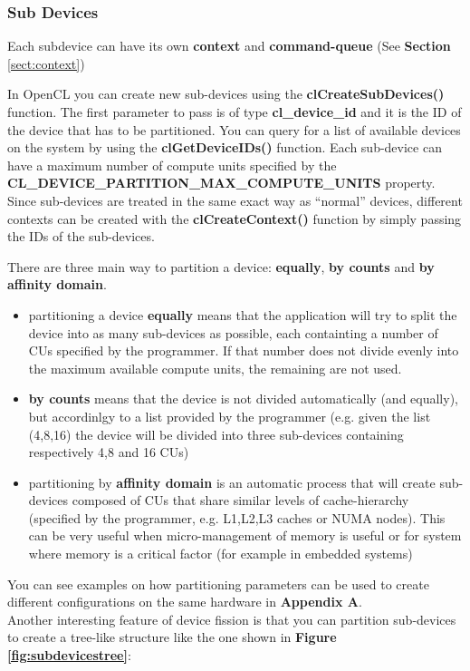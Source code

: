 \subsubsection{Sub Devices} \label{sect:DF-subdevices}
Each subdevice can have its own \textbf{context} and \textbf{command-queue} (See \textbf{Section} \ref{sect:context})

\begin{CLCode}
In OpenCL you can create new sub-devices using the \textbf{clCreateSubDevices()} function. The first parameter to pass is of type \textbf{cl\_device\_id} and it is the ID of the device that has to be partitioned. You can query for a list of available devices on the system by using the \textbf{clGetDeviceIDs()} function. Each sub-device can have a maximum number of compute units specified by the \textbf{CL\_DEVICE\_PARTITION\_MAX\_COMPUTE\_UNITS} property.
Since sub-devices are treated in the same exact way as "`normal"' devices, different contexts can be created with the \textbf{clCreateContext()} function by simply passing the IDs of the sub-devices.
\label{Code:DevicePartitioning}
\end{CLCode}

There are three main way to partition a device: \textbf{equally}, \textbf{by counts} and \textbf{by affinity domain}.

\begin{itemize}
	\item partitioning a device \textbf{equally} means that the application will try to split the device into as many sub-devices as possible, each containting a number of CUs specified by the programmer. If that number does not divide evenly into the maximum available compute units, the remaining are not used.
	\item \textbf{by counts} means that the device is not divided automatically (and equally), but accordinlgy to a list provided by the programmer (e.g. given the list (4,8,16) the device will be divided into three sub-devices containing respectively 4,8 and 16 CUs)
	\item partitioning by \textbf{affinity domain} is an automatic process that will create sub-devices composed of CUs that share similar levels of cache-hierarchy (specified by the programmer, e.g. L1,L2,L3 caches or NUMA nodes). This can be very useful when micro-management of memory is useful or for system where memory is a critical factor (for example in  embedded systems)
\end{itemize}

You can see examples on how partitioning parameters can be used to create different configurations on the same hardware in \textbf{Appendix A}.\\
Another interesting feature of device fission is that you can partition sub-devices to create a tree-like structure like the one shown in \textbf{Figure \ref{fig:subdevicestree}}:

